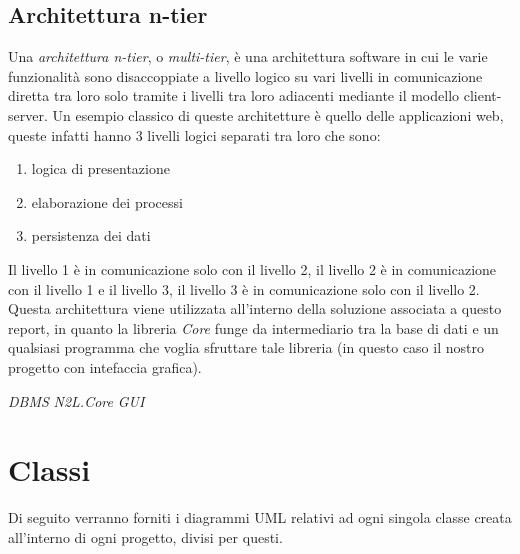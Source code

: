 \documentclass[a4paper,10pt]{report}
\begin{document}
		\subsection{Architettura n-tier}
			Una {\itshape architettura n-tier}, o {\itshape multi-tier}, è una
				architettura software in cui le varie funzionalità sono disaccoppiate a
				livello logico su vari livelli in comunicazione diretta tra loro solo
				tramite i livelli tra loro adiacenti mediante il modello client-server.
				Un esempio classico di queste architetture è quello delle applicazioni
				web, queste infatti hanno 3 livelli logici separati tra loro che sono:
				\begin{enumerate}
					\item logica di presentazione
					\item elaborazione dei processi
					\item persistenza dei dati
				\end{enumerate}
				Il livello 1 è in comunicazione solo con il livello 2,
				il livello 2 è in comunicazione con il livello 1 e il livello 3,
				il livello 3 è in comunicazione solo con il livello 2.\\
				Questa architettura viene utilizzata all'interno della soluzione
				associata a questo report, in quanto la libreria {\itshape Core} funge
				da intermediario tra la base di dati e un qualsiasi programma che voglia
				sfruttare tale libreria (in questo caso il nostro progetto con
				intefaccia grafica).
				\\\vspace{1cm}
				\begin{center}
					\Huge{
						{\itshape DBMS}
						{\longleftrightarrow}
						{\itshape N2L.Core}
						{\longleftrightarrow}
						{\itshape GUI}
						}
					\end{center}
	\newpage
	\section{Classi}
		Di seguito verranno forniti i diagrammi UML relativi ad ogni singola classe
		creata all'interno di ogni progetto, divisi per questi.
\end{document}
